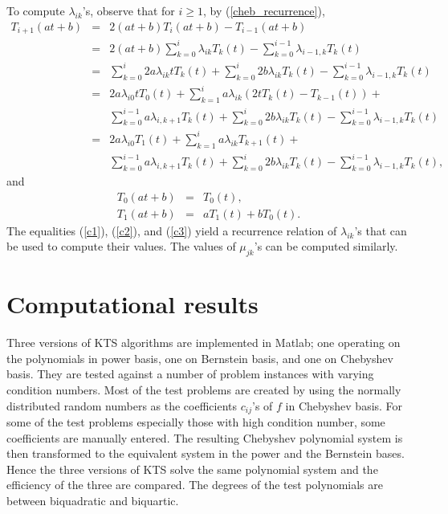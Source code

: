 \documentclass[12pt]{article}
\begin{document}
To compute $\lambda_{ik}$'s, observe that for $i \geq 1$, by
(\ref{cheb_recurrence}),
\begin{eqnarray}
T_{i+1}(at+b) &=& 2(at+b)T_i(at+b) - T_{i-1}(at+b) \nonumber \\
& = & 2(at+b)\sum_{k=0}^i \lambda_{ik}T_k(t) - \sum_{k=0}^{i-1}
\lambda_{i-1,k}T_k(t) \nonumber \\
& = & \sum_{k=0}^i 2a\lambda_{ik}tT_k(t) + \sum_{k=0}^i 2b
\lambda_{ik}T_k(t) - \sum_{k=0}^{i-1}
\lambda_{i-1,k}T_k(t) \nonumber \\
& = & 2a\lambda_{i0}tT_0(t) + \sum_{k=1}^i a\lambda_{ik}
\left(2tT_k(t)-T_{k-1}(t) \right) + \nonumber \\
& & \sum_{k=0}^{i-1} a\lambda_{i,k+1} T_k(t) + \sum_{k=0}^i 2b
\lambda_{ik}T_k(t) - \sum_{k=0}^{i-1}
\lambda_{i-1,k}T_k(t) \nonumber \\
& = & 2a\lambda_{i0}T_1(t) + \sum_{k=1}^i a \lambda_{ik}
T_{k+1}(t) + \nonumber \\
& & \sum_{k=0}^{i-1} a\lambda_{i,k+1} T_k(t) + \sum_{k=0}^i 2b
\lambda_{ik}T_k(t) - \sum_{k=0}^{i-1} \lambda_{i-1,k}T_k(t),
\label{c1}
\end{eqnarray}
and
\begin{eqnarray}
T_0(at+b) &=& T_0(t),  \label{c2} \\
T_1(at+b) &=& aT_1(t)+bT_0(t). \label{c3}
\end{eqnarray}
The equalities (\ref{c1}), (\ref{c2}), and (\ref{c3}) yield a
recurrence relation of $\lambda_{ik}$'s that can be used to
compute their values.  The values of $\mu_{jk}$'s can be computed
similarly.

\section{Computational results}

Three versions of KTS algorithms are implemented in Matlab; one
operating on the polynomials in power basis, one on Bernstein
basis, and one on Chebyshev basis.  They are tested against a
number of problem instances with varying condition numbers.  Most
of the test problems are created by using the normally distributed
random numbers as the coefficients $c_{ij}$'s of $f$ in Chebyshev
basis.  For some of the test problems especially those with high
condition number, some coefficients are manually entered.  The
resulting Chebyshev polynomial system is then transformed to the
equivalent system in the power and the Bernstein bases. Hence the
three versions of KTS solve the same polynomial system and the
efficiency of the three are compared. The degrees of the test
polynomials are between biquadratic and biquartic.
\end{document}
